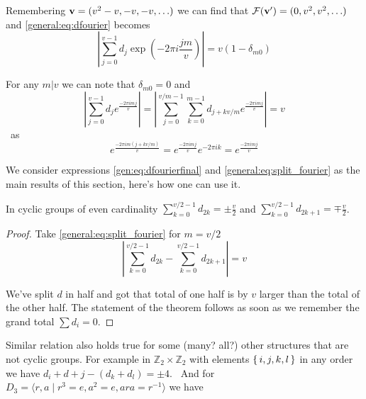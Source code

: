         Remembering ${\bf v} = (v^2-v, -v, -v, \ldots)$ we can find that $\mathcal{F}({\bf v'}) = (0,v^2,v^2,\ldots)$ and \eqref{general:eq:dfourier} becomes
        \begin{equation}
            \label{gen:eq:dfourierfinal}
            \left| \sum_{j=0}^{v-1} d_j \exp(-2\pi i \frac{jm}v) \right| = v (1-\delta_{m0})
        \end{equation}

        For any $m | v$ we can note that $\delta_{m0}=0$ and
        \begin{equation}
            \label{general:eq:split_fourier}
            \left| \sum_{j=0}^{v-1} d_j e^{\frac{-2\pi i m j}v} \right|
            = \left| \sum_{j=0}^{v/m-1} \sum_{k=0}^{m-1}  d_{j+kv/m} e^{\frac{-2\pi i m j}v} \right|
            =v
        \end{equation}\
        as 
        \begin{equation}
            e^{\frac{-2\pi i m (j+kv/m)}v} = e^{\frac{-2\pi i m j}v} e^{-2\pi i k} = e^{\frac{-2\pi i m j}v}
        \end{equation}
        
        We consider expressions \eqref{gen:eq:dfourierfinal} and \eqref{general:eq:split_fourier} as the main results of this section, here's how one can use it.
        
        \begin{proposition}
            \label{general:theorem:even_cyclic}
            In cyclic groups of even cardinality $\sum_{k=0}^{v/2-1} d_{2k} = \pm \frac v2$ and $\sum_{k=0}^{v/2-1} d_{2k+1} = \mp \frac v2$.
        \end{proposition}
        \begin{proof}
            Take \eqref{general:eq:split_fourier} for $m=v/2$
            \begin{equation}
                \left| \sum_{k=0}^{v/2-1} d_{2k} - \sum_{k=0}^{v/2-1} d_{2k+1} \right| = v
            \end{equation}
            
            We've split $d$ in half and got that total of one half is by $v$ larger than the total of the other half. The statement of the theorem follows as soon as we remember the grand total $\sum d_i = 0$.
        \end{proof}
        
        \begin{remark}
            Similar relation also holds true for some (many? all?) other structures that are not cyclic groups. For example in $\mathbb Z_2 \times \mathbb Z_2$ with elements $\set{i,j,k,l}$ in any order we have $d_i+d+j-(d_k+d_l)=\pm 4$. \
            And for $D_3 = \langle r,a \mid r^3=e, a^2=e,ara=r^{-1} \rangle$ we have 
        \end{remark}



